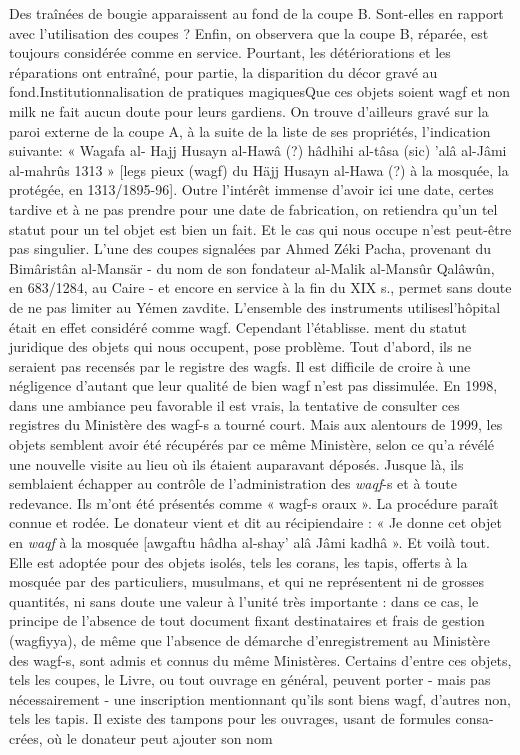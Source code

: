 Des traînées de bougie apparaissent au fond de la coupe B. Sont-elles en rapport avec l'utilisation des coupes ? Enfin, on observera que la coupe B, réparée, est toujours considérée comme en service. Pourtant, les détériorations et les réparations ont entraîné, pour partie, la disparition du décor gravé au fond.Institutionnalisation de pratiques magiquesQue ces objets soient wagf et non milk ne fait aucun doute pour leurs gardiens. On trouve d'ailleurs gravé sur la paroi externe de la coupe A, à la suite de la liste de ses propriétés, l'indication suivante: « Wagafa al-
Hajj Husayn al-Hawâ (?) hâdhihi al-tâsa (sic) 'alâ al-Jâmi al-mahrûs
1313 » [legs pieux (wagf) du Häjj Husayn al-Hawa (?) à la mosquée, la protégée, en 1313/1895-96]. Outre l'intérêt immense d'avoir ici une date, certes tardive et à ne pas prendre pour une date de fabrication, on retiendra qu'un tel statut pour un tel objet est bien un fait. Et le cas qui nous occupe n'est peut-être pas singulier. L'une des coupes signalées par
Ahmed Zéki Pacha, provenant du Bimâristân al-Mansär - du nom de son
fondateur al-Malik al-Mansûr Qalâwûn, en 683/1284, au Caire - et encore en service à la fin du XIX s., permet sans doute de ne pas limiter
au Yémen zavdite. L'ensemble des instruments utilisesl'hôpital était en effet considéré comme wagf. Cependant l'établisse. ment du statut juridique des objets qui nous occupent, pose problème.
Tout d'abord, ils ne seraient pas recensés par le registre des wagfs. Il est difficile de croire à une négligence d'autant que leur qualité de bien wagf n'est pas dissimulée. En 1998, dans une ambiance peu favorable il est vrais, la tentative de consulter ces registres du Ministère des wagf-s a tourné court. Mais aux alentours de 1999, les objets semblent avoir été récupérés par ce même Ministère, selon ce qu'a révélé une nouvelle visite au lieu où ils étaient auparavant déposés. Jusque là, ils semblaient échapper au contrôle de l'administration des \textit{waqf}-s et à toute redevance.
Ils m'ont été présentés comme « wagf-s oraux ». La procédure paraît connue et rodée. Le donateur vient et dit au récipiendaire : « Je donne cet
objet en \textit{waqf} à la mosquée [awgaftu hâdha al-shay' alâ Jâmi kadhâ ».
Et voilà tout. Elle est adoptée pour des objets isolés, tels les corans, les tapis, offerts à la mosquée par des particuliers, musulmans, et qui ne représentent ni de grosses quantités, ni sans doute une valeur à l'unité très importante : dans ce cas, le principe de l'absence de tout document fixant destinataires et frais de gestion (wagfiyya), de même que l'absence de démarche d'enregistrement au Ministère des wagf-s, sont admis et connus du même Ministères. Certains d'entre ces objets, tels les coupes, le Livre, ou tout ouvrage en général, peuvent porter - mais pas nécessairement - une inscription mentionnant qu'ils sont biens wagf, d'autres non, tels les tapis. Il existe des tampons pour les ouvrages, usant de formules consa-crées, où le donateur peut ajouter son nom%
